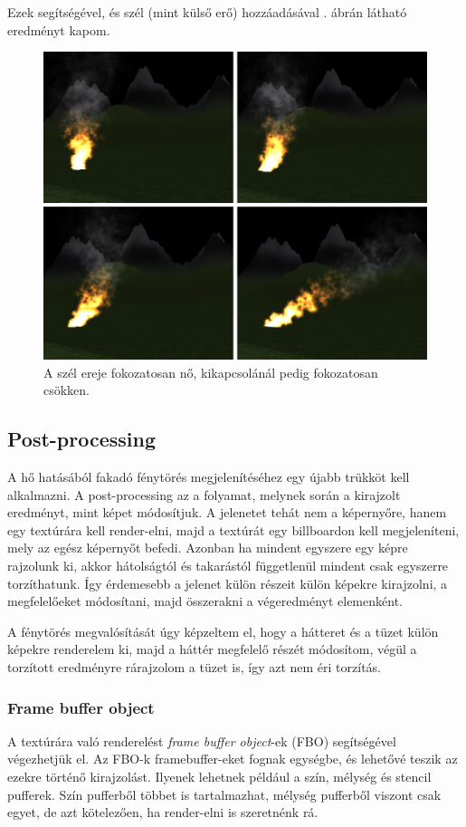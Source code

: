 Ezek segítségével, és szél (mint külső erő) hozzáadásával . ábrán látható eredményt kapom.
\begin{figure}[h]
 \centering
 \includegraphics[width=\textwidth]{kepek/particleWind.png}
 \caption{A szél ereje fokozatosan nő, kikapcsolánál pedig fokozatosan csökken.}
 \label{fig:particleWind}
\end{figure}

\subsection{Post-processing}
A hő hatásából fakadó fénytörés megjelenítéséhez egy újabb trükköt kell alkalmazni. A post-processing az a folyamat, melynek során a kirajzolt eredményt, mint képet módosítjuk. A jelenetet tehát nem a képernyőre, hanem egy textúrára kell render-elni, majd a textúrát egy billboardon kell megjeleníteni, mely az egész képernyőt befedi. Azonban ha mindent egyszere egy képre rajzolunk ki, akkor hátolságtól és takarástól függetlenül mindent csak egyszerre torzíthatunk. Így érdemesebb a jelenet külön részeit külön képekre kirajzolni, a megfelelőeket módosítani, majd összerakni a végeredményt elemenként.

A fénytörés megvalósítását úgy képzeltem el, hogy a hátteret és a tüzet külön képekre renderelem ki, majd a háttér megfelelő részét módosítom, végül a torzított eredményre rárajzolom a tüzet is, így azt nem éri torzítás.

\subsubsection{Frame buffer object}
A textúrára való renderelést \textit{frame buffer object}-ek (FBO) segítségével végezhetjük el. Az FBO-k framebuffer-eket fognak egységbe, és lehetővé teszik az ezekre történő kirajzolást. Ilyenek lehetnek például a szín, mélység és stencil pufferek. Szín pufferből többet is tartalmazhat, mélység pufferből viszont csak egyet, de azt kötelezően, ha render-elni is szeretnénk rá. 

